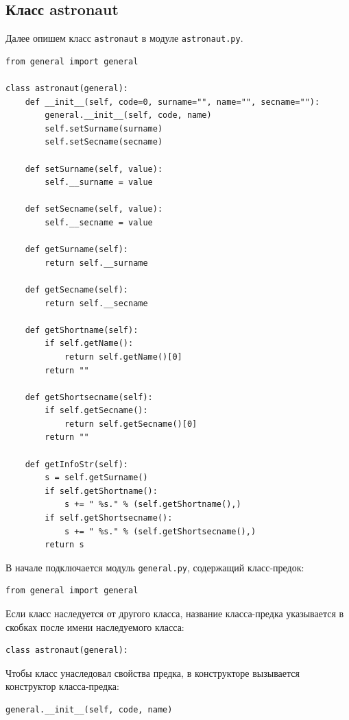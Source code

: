 \documentclass[a4paper,14pt]{extarticle}
\begin{document}
\subsection{Класс astronaut}

Далее опишем класс \texttt{astronaut} в модуле \texttt{astronaut.py}.

\begin{lstlisting}[caption={Модуль \texttt{astronaut.py}}]
from general import general

class astronaut(general):
    def __init__(self, code=0, surname="", name="", secname=""):
        general.__init__(self, code, name)
        self.setSurname(surname)
        self.setSecname(secname)

    def setSurname(self, value):
        self.__surname = value

    def setSecname(self, value):
        self.__secname = value

    def getSurname(self):
        return self.__surname

    def getSecname(self):
        return self.__secname

    def getShortname(self):
        if self.getName():
            return self.getName()[0]
        return ""

    def getShortsecname(self):
        if self.getSecname():
            return self.getSecname()[0]
        return ""

    def getInfoStr(self):
        s = self.getSurname()
        if self.getShortname():
            s += " %s." % (self.getShortname(),)
        if self.getShortsecname():
            s += " %s." % (self.getShortsecname(),)
        return s
\end{lstlisting}

В начале подключается модуль \texttt{general.py}, содержащий класс-предок:
\begin{lstlisting}
from general import general
\end{lstlisting}

Если класс наследуется от другого класса, название класса-предка указывается в скобках после имени наследуемого класса:
\begin{lstlisting}
class astronaut(general):
\end{lstlisting}

Чтобы класс унаследовал свойства предка, в конструкторе вызывается конструктор класса-предка:
\begin{lstlisting}
general.__init__(self, code, name)
\end{lstlisting}
\end{document}
